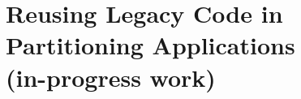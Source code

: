 \declarecommand{\sysname}{\civet{}}

\chapter{Reusing Legacy Code in Partitioning \java{} Applications\\ (in-progress work)}
\label{chap:civet}






%

